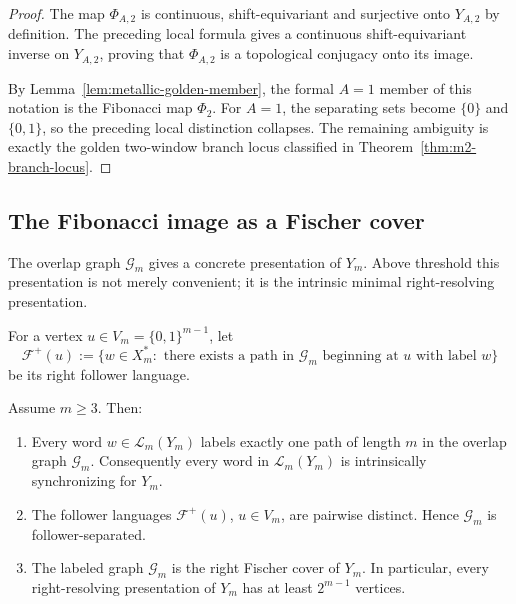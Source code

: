 \begin{proof}
The map $\Phi_{A,2}$ is continuous, shift-equivariant and surjective onto
$Y_{A,2}$ by definition. The preceding local formula gives a continuous
shift-equivariant inverse on $Y_{A,2}$, proving that $\Phi_{A,2}$ is a
topological conjugacy onto its image.

By Lemma~\ref{lem:metallic-golden-member}, the formal $A=1$ member of this
notation is the Fibonacci map $\Phi_2$.  For $A=1$, the separating sets become
$\{0\}$ and $\{0,1\}$, so the preceding local distinction collapses. The
remaining ambiguity is exactly the golden two-window branch locus classified
in Theorem~\ref{thm:m2-branch-locus}.
\end{proof}

\subsection{The Fibonacci image as a Fischer cover}

The overlap graph $\mathcal G_m$ gives a concrete presentation of $Y_m$. Above
threshold this presentation is not merely convenient; it is the intrinsic
minimal right-resolving presentation.

For a vertex $u\in V_m=\{0,1\}^{m-1}$, let
\[
\mathcal F^+(u):=
\{w\in X_m^*:\text{ there exists a path in }\mathcal G_m
\text{ beginning at }u\text{ with label }w\}
\]
be its right follower language.

\begin{theorem}
\label{thm:fischer-cover-stabilized-image}
Assume $m\ge3$.  Then:
\begin{enumerate}[label=(\roman*),leftmargin=*,itemsep=2pt]
  \item Every word $w\in\mathcal L_m(Y_m)$ labels exactly one path of length
  $m$ in the overlap graph $\mathcal G_m$. Consequently every word in
  $\mathcal L_m(Y_m)$ is intrinsically synchronizing for $Y_m$.
  \item The follower languages $\mathcal F^+(u)$, $u\in V_m$, are pairwise
  distinct.  Hence $\mathcal G_m$ is follower-separated.
  \item The labeled graph $\mathcal G_m$ is the right Fischer cover of $Y_m$.
  In particular, every right-resolving presentation of $Y_m$ has at least
  $2^{m-1}$ vertices.
\end{enumerate}
\end{theorem}

